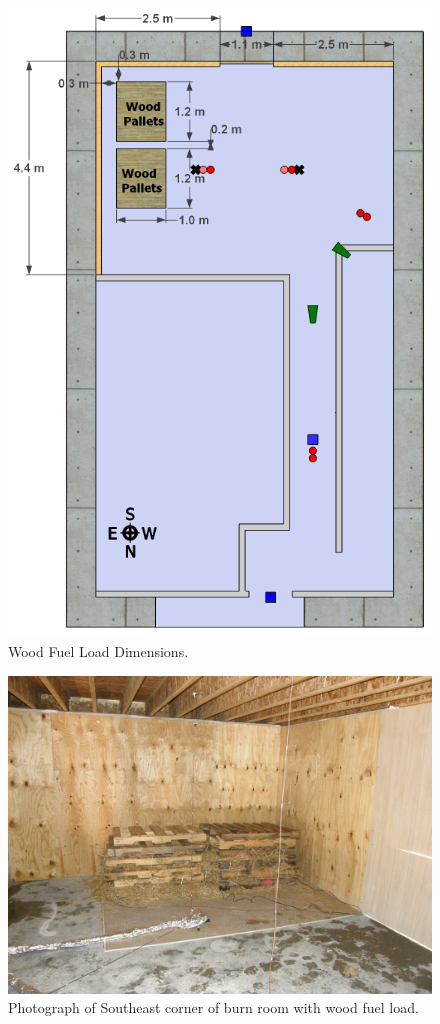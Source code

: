 \documentclass[12pt,oneside]{book}
\begin{document}
\begin{figure}[!ht]
	\includegraphics[width=.8\columnwidth]{../Figures/Pictures/DelCoSingleStoryWoodFuelLoad}
	\caption{Wood Fuel Load Dimensions.}
	\label{fig:Wood_Fuel_Load_Dimensions}
\end{figure}

\begin{figure}[!ht]
	\includegraphics[width=6in]{../Figures/Pictures/Wood_Fuel_Package}
	\caption{Photograph of Southeast corner of burn room with wood fuel load.}
	\label{fig:Wood_Fuel_Load}
\end{figure}
\end{document}

